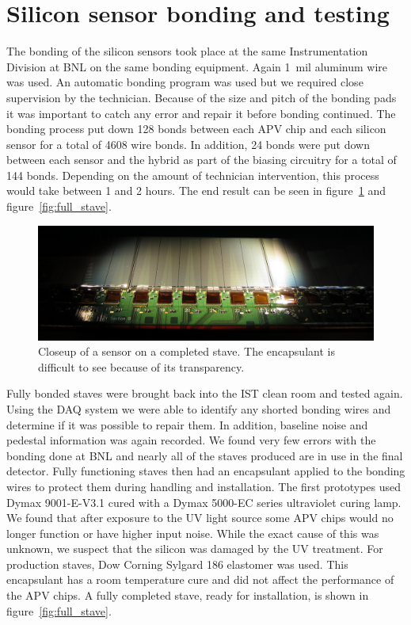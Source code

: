 \documentclass[preprint,12pt]{elsarticle}
\begin{document}
\section{Silicon sensor bonding and testing}
The bonding of the silicon sensors took place at the same Instrumentation
Division at BNL on the same bonding equipment. Again 1~mil aluminum wire was
used. An automatic bonding program was used but we required close supervision by
the technician. Because of the size and pitch of the bonding pads it was
important to catch any error and repair it before bonding continued. The
bonding process put down 128 bonds between each APV chip and each silicon sensor
for a total of 4608 wire bonds. In addition, 24 bonds were put down between
each sensor and the hybrid as part of the biasing circuitry for a total of 144
bonds. Depending on the amount of technician intervention, this process would
take between 1 and 2 hours.  The end result can be seen in figure~\ref{fig:si_bonded}
and figure~\ref{fig:full_stave}.

\begin{figure}
\begin{center}
\includegraphics[width=6.5in, keepaspectratio=true, angle=0]{graphics/si_bonded.jpg}
\caption{Closeup of a sensor on a completed stave.  The encapsulant is difficult
to see because of its transparency.
\label{fig:si_bonded}}
\end{center}
\end{figure}
%
Fully bonded staves were brought back into the IST clean room and tested
again. Using the DAQ system we were able to identify any shorted bonding wires
and determine if it was possible to repair them. In addition, baseline noise
and pedestal information was again recorded. We found very few errors with the
bonding done at BNL and nearly all of the staves produced are in use in the
final detector. Fully functioning staves then had an encapsulant applied to the
bonding wires to protect them during handling and installation. The first
prototypes used Dymax 9001-E-V3.1 cured with a Dymax 5000-EC series ultraviolet
curing lamp. We found that after exposure to the UV light source some APV chips
would no longer function or have higher input noise. While the exact cause of
this was unknown, we suspect that the silicon was damaged by the UV treatment.
For production staves, Dow Corning Sylgard 186 elastomer was used. This
encapsulant has a room temperature cure and did not affect the performance of
the APV chips.  A fully completed stave, ready for installation, is shown in
figure~\ref{fig:full_stave}.
\end{document}
